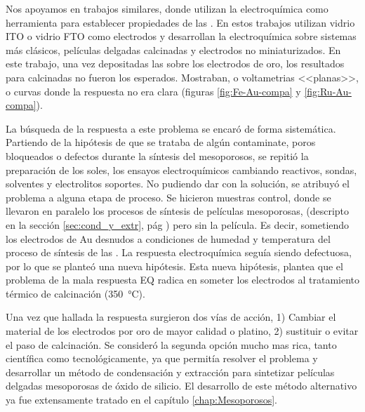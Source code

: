 {  			Nos apoyamos en trabajos similares\cite{Otal2006,Calvo2009,Fattakhova-Rohlfing2007,Rohlfing2005}, donde utilizan la electroquímica como herramienta para establecer propiedades de las \pdm. En estos trabajos utilizan vidrio ITO o vidrio FTO como electrodos y desarrollan la electroquímica sobre sistemas más clásicos, películas delgadas calcinadas y electrodos no miniaturizados. En este trabajo, una vez depositadas las \pdm\space sobre los electrodos de oro, los resultados para \pdm\space calcinadas no fueron los esperados.  Mostraban, o voltametrias <<planas>>, o curvas donde la respuesta no era clara (figuras \ref{fig:Fe-Au-compa} y \ref{fig:Ru-Au-compa}). 

  			La búsqueda de la respuesta a este problema se encaró de forma sistemática. Partiendo de la hipótesis de que se trataba de algún contaminate, poros bloqueados o defectos durante la síntesis del mesoporosos, se repitió la preparación de los soles, los ensayos electroquímicos cambiando reactivos, sondas, solventes y electrolitos soportes. No pudiendo dar con la solución, se atribuyó el problema a alguna etapa de proceso. Se hicieron muestras control, donde se llevaron en paralelo los procesos de síntesis de películas mesoporosas, (descripto en la sección \ref{sec:cond_y_extr}, pág \pageref{sec:cond_y_extr}) pero sin la película. Es decir, sometiendo los electrodos de Au desnudos a condiciones de humedad y temperatura del proceso de síntesis de las \pdm. La respuesta electroquímica seguía siendo defectuosa, por lo que se planteó una nueva hipótesis. Esta nueva hipótesis, plantea que el problema de la mala respuesta EQ radica en someter los electrodos al tratamiento térmico de calcinación (\SI{350}{\celsius}).

  			Una vez que hallada la respuesta surgieron dos vías de acción, 1) Cambiar el material de los electrodos por oro de mayor calidad o platino, 2) sustituir o evitar el paso de calcinación. Se consideró la segunda opción mucho mas rica, tanto científica como tecnológicamente, ya que permitía resolver el problema y desarrollar un método de condensación y extracción para sintetizar películas delgadas mesoporosas de óxido de silicio. El desarrollo de este método alternativo ya fue extensamente tratado en el capítulo \ref{chap:Mesoporosos}.

}
